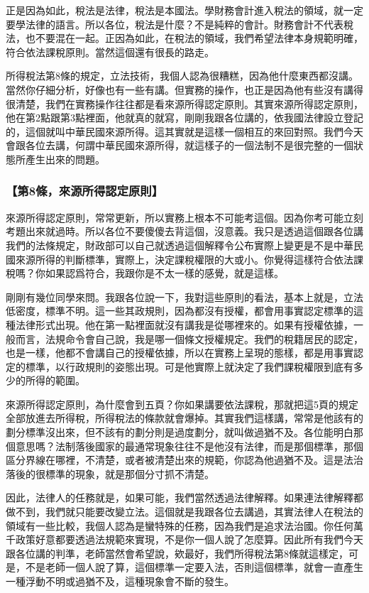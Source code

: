 \documentclass[oneside,sub3section]{ctexbook}
\begin{document}
正是因為如此，稅法是法律，稅法是本國法。學財務會計進入稅法的領域，就一定要學法律的語言。所以各位，稅法是什麼？不是純粹的會計。財務會計不代表稅法，也不要混在一起。正因為如此，在稅法的領域，我們希望法律本身規範明確，符合依法課稅原則。當然這個還有很長的路走。

所得稅法第8條的規定，立法技術，我個人認為很糟糕，因為他什麼東西都沒講。當然你仔細分析，好像也有一些有講。但實務的操作，也正是因為他有些沒有講得很清楚，我們在實務操作往往都是看來源所得認定原則。其實來源所得認定原則，他在第2點跟第3點裡面，他就真的就寫，剛剛我跟各位講的，依我國法律設立登記的，這個就叫中華民國來源所得。這其實就是這樣一個相互的來回對照。我們今天會跟各位去講，何謂中華民國來源所得，就這樣子的一個法制不是很完整的一個狀態所產生出來的問題。

\hypertarget{ux7b2c8ux689dux4f86ux6e90ux6240ux5f97ux8a8dux5b9aux539fux5247}{%
\subsubsection{【第8條，來源所得認定原則】}\label{ux7b2c8ux689dux4f86ux6e90ux6240ux5f97ux8a8dux5b9aux539fux5247}}

來源所得認定原則，常常更新，所以實務上根本不可能考這個。因為你考可能立刻考題出來就過時。所以各位不要傻傻去背這個，沒意義。我只是透過這個跟各位講我們的法條規定，財政部可以自己就透過這個解釋令公布實際上變更是不是中華民國來源所得的判斷標準，實際上，決定課稅權限的大或小。你覺得這樣符合依法課稅嗎？你如果認爲符合，我跟你是不太一樣的感覺，就是這樣。

剛剛有幾位同學來問。我跟各位說一下，我對這些原則的看法，基本上就是，立法低密度，標準不明。這一些其政規則，因為都沒有授權，都會用事實認定標準的這種法律形式出現。他在第一點裡面就沒有講我是從哪裡來的。如果有授權依據，一般而言，法規命令會自己說，我是哪一個條文授權規定。我們的稅籍居民的認定，也是一樣，他都不會講自己的授權依據，所以在實務上呈現的態樣，都是用事實認定的標準，以行政規則的姿態出現。可是他實際上就決定了我們課稅權限到底有多少的所得的範圍。

來源所得認定原則，為什麼會到五頁？你如果講要依法課稅，那就把這5頁的規定全部放進去所得稅，所得稅法的條款就會爆掉。其實我們這樣講，常常是他該有的劃分標準沒出來，但不該有的劃分則是過度劃分，就叫做過猶不及。各位能明白那個意思嗎？法制落後國家的最通常現象往往不是他沒有法律，而是那個標準，那個區分界線在哪裡，不清楚，或者被清楚出來的規範，你認為他過猶不及。這是法治落後的很標準的現象，就是那個分寸抓不清楚。

因此，法律人的任務就是，如果可能，我們當然透過法律解釋。如果連法律解釋都做不到，我們就只能要改變立法。這個就是我跟各位去講過，其實法律人在稅法的領域有一些比較，我個人認為是蠻特殊的任務，因為我們是追求法治國。你任何萬千政策好意都要透過法規範來實現，不是你一個人說了怎麼算。因此所有我們今天跟各位講的判準，老師當然會希望說，欸最好，我們所得稅法第8條就這樣定，可是，不是老師一個人說了算，這個標準一定要入法，否則這個標準，就會一直產生一種浮動不明或過猶不及，這種現象會不斷的發生。
\end{document}
